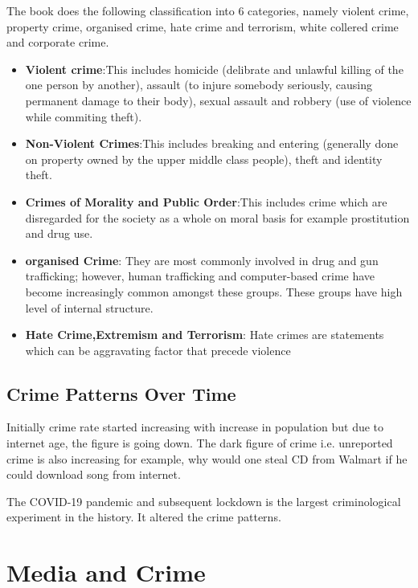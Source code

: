 \documentclass[11pt]{article}
\begin{document}
The book does the following classification into 6 categories, namely violent crime, property crime, organised crime, hate crime and terrorism, white collered crime and corporate crime.

\begin{itemize}
    \item \textbf{Violent crime}:This includes homicide (delibrate and unlawful killing of the one person by another), assault (to injure somebody seriously, causing permanent damage to their body), sexual assault and robbery (use of violence while commiting theft).

    \item \textbf{Non-Violent Crimes}:This includes breaking and entering (generally done on property owned by the upper middle class people), theft and identity theft.

    \item \textbf{Crimes of Morality and Public Order}:This includes crime which are disregarded for the society as a whole on moral basis for example prostitution and drug use.
    
    \item \textbf{organised Crime}: They are most commonly involved in drug and gun trafficking; however, human trafficking and computer-based crime have become increasingly common amongst these groups. These groups have high level of internal structure.
    
    \item \textbf{Hate Crime,Extremism and Terrorism}: Hate crimes are statements which can be aggravating factor that precede violence
    
\end{itemize}

\subsection{Crime Patterns Over Time}

Initially crime rate started increasing with increase in population but due to internet age, the figure is going down. The dark figure of crime i.e. unreported crime is also increasing for example, why would one steal CD from Walmart if he could download song from internet.

The COVID-19 pandemic and subsequent lockdown is the largest criminological experiment in the history. It altered the crime patterns.

\section{Media and Crime}
\end{document}
